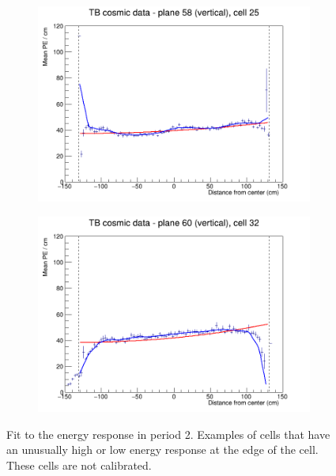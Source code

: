 \documentclass[12pt,a4paper]{article}
\begin{document}
\begin{figure}[h]
\begin{subfigure}{0.5\textwidth}
  \end{subfigure}
  \begin{subfigure}{0.5\textwidth}
    \includegraphics[width=\linewidth]{RelativeCalibrationResults/p2_058_025.png}
  \end{subfigure}
  \begin{subfigure}{0.5\textwidth}
    \includegraphics[width=\linewidth]{RelativeCalibrationResults/p2_060_032.png}
  \end{subfigure}
  \caption{Fit to the energy response in period 2. Examples of cells that have an unusually high or low energy response at the edge of the cell. These cells are not calibrated.}
  \label{figAttenfitResultsPerio2_CellEdge}
\end{figure}

\FloatBarrier
\end{document}
